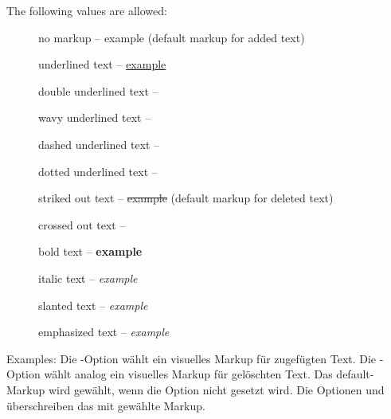	The following values are allowed:
	\begin{description}
		\item [] no markup -- example (default markup for added text)
		\item [] underlined text -- \uline{example}
		\item [] double underlined text -- 
		\item [] wavy underlined text -- 
		\item [] dashed underlined text -- 
		\item [] dotted underlined text -- 
		\item [] striked out text -- \sout{example} (default markup for deleted text)
		\item [] crossed out text -- 
		\item [] bold text -- \textbf{example}
		\item [] italic text -- \textit{example}
		\item [] slanted text -- \textsl{example}
		\item [] emphasized text -- \emph{example}
	\end{description}

	Examples:
\fi
	\ifGERMAN
		Die -Option wählt ein visuelles Markup für zugefügten Text.
		Die -Option wählt analog ein visuelles Markup für gelöschten Text.
		Das default-Markup wird gewählt, wenn die Option nicht gesetzt wird.
		Die Optionen  und  überschreiben das mit  gewählte Markup.

